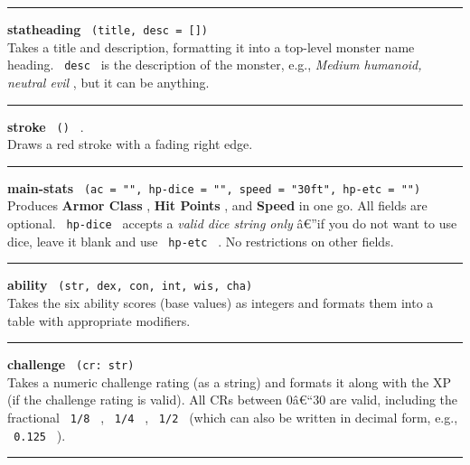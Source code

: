 \begin{center}\rule{0.5\linewidth}{0.5pt}\end{center}

\textbf{statheading} \texttt{\ (title,\ desc\ =\ {[}{]})\ }\\
Takes a title and description, formatting it into a top-level monster
name heading. \texttt{\ desc\ } is the description of the monster, e.g.,
\emph{Medium humanoid, neutral evil} , but it can be anything.

\begin{center}\rule{0.5\linewidth}{0.5pt}\end{center}

\textbf{stroke} \texttt{\ ()\ } .\\
Draws a red stroke with a fading right edge.

\begin{center}\rule{0.5\linewidth}{0.5pt}\end{center}

\textbf{main-stats}
\texttt{\ (ac\ =\ "",\ hp-dice\ =\ "",\ speed\ =\ "30ft",\ hp-etc\ =\ "")\ }\\
Produces \textbf{Armor Class} , \textbf{Hit Points} , and \textbf{Speed}
in one go. All fields are optional. \texttt{\ hp-dice\ } accepts a
\emph{valid dice string only} â€''if you do not want to use dice, leave
it blank and use \texttt{\ hp-etc\ } . No restrictions on other fields.

\begin{center}\rule{0.5\linewidth}{0.5pt}\end{center}

\textbf{ability} \texttt{\ (str,\ dex,\ con,\ int,\ wis,\ cha)\ }\\
Takes the six ability scores (base values) as integers and formats them
into a table with appropriate modifiers.

\begin{center}\rule{0.5\linewidth}{0.5pt}\end{center}

\textbf{challenge} \texttt{\ (cr:\ str)\ }\\
Takes a numeric challenge rating (as a string) and formats it along with
the XP (if the challenge rating is valid). All CRs between 0â€``30 are
valid, including the fractional \texttt{\ 1/8\ } , \texttt{\ 1/4\ } ,
\texttt{\ 1/2\ } (which can also be written in decimal form, e.g.,
\texttt{\ 0.125\ } ).

\begin{center}\rule{0.5\linewidth}{0.5pt}\end{center}

